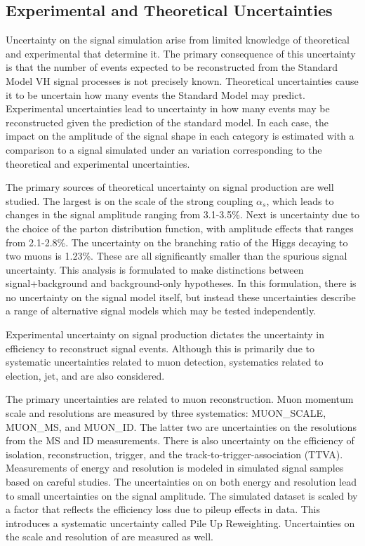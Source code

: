 \subsection{Experimental and Theoretical Uncertainties}

Uncertainty on the signal simulation arise from limited knowledge of theoretical and experimental that determine it. 
The primary consequence of this uncertainty is that the number of events expected to be reconstructed from the Standard Model VH signal processes is not precisely known.
Theoretical uncertainties cause it to be uncertain how many events the Standard Model may predict.
Experimental uncertainties lead to uncertainty in how many events may be reconstructed given the prediction of the standard model.
In each case, the impact on the amplitude of the signal shape in each category is estimated with a comparison to a signal simulated under an variation corresponding to the theoretical and experimental uncertainties.

The primary sources of theoretical uncertainty on signal production are well studied. \cite{CERNYellowReport4}
The largest is on the scale of the strong coupling $\alpha_s$, which leads to changes in the signal amplitude ranging from 3.1-3.5\%.
Next is uncertainty due to the choice of the parton distribution function, with amplitude effects that ranges from 2.1-2.8\%.
The uncertainty on the branching ratio of the Higgs decaying to two muons is 1.23\%. \cite{CERNYellowReport4}
These are all significantly smaller than the spurious signal uncertainty.
This analysis is formulated to make distinctions between signal+background and background-only hypotheses.
In this formulation, there is no uncertainty on the signal model itself, but instead these uncertainties describe a range of alternative signal models which may be tested independently.

Experimental uncertainty on signal production dictates the uncertainty in efficiency to reconstruct signal events. 
Although this is primarily due to systematic uncertainties related to muon detection, systematics related to election, jet, and \met are also considered.

The primary uncertainties are related to muon reconstruction.
Muon momentum scale and resolutions are measured by three systematics: MUON\_SCALE, MUON\_MS, and MUON\_ID. 
The latter two are uncertainties on the resolutions from the MS and ID measurements.
There is also uncertainty on the efficiency of isolation, reconstruction, trigger, and the track-to-trigger-association (TTVA). \cite{muonReco}
Measurements of energy and resolution is modeled in simulated signal samples based on careful studies. \cite{elecReco}
The uncertainties on on both energy and resolution lead to small uncertainties on the signal amplitude.
The simulated dataset is scaled by a factor that reflects the efficiency loss due to pileup effects in data.
This introduces a systematic uncertainty called Pile Up Reweighting.
Uncertainties on the scale and resolution of \met are measured as well.

